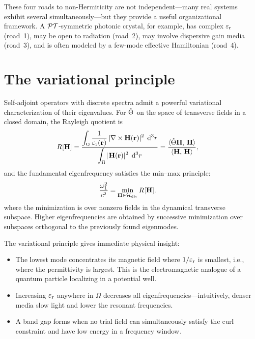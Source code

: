 These four roads to non-Hermiticity are not independent---many real systems
exhibit several simultaneously---but they provide a useful organizational
framework. A $\mathcal{PT}$-symmetric photonic crystal, for example, has
complex $\varepsilon_{\mathrm{r}}$ (road~1), may be open to radiation (road~2), may involve
dispersive gain media (road~3), and is often modeled by a few-mode
effective Hamiltonian (road~4).


\section{The variational principle}
\label{sec:variational}

Self-adjoint operators with discrete spectra admit a powerful variational
characterization of their eigenvalues. For $\hat{\Theta}$ on the space of
transverse fields in a closed domain, the Rayleigh quotient is
\begin{equation}
 R[\mathbf{H}] = \frac{\displaystyle\int_\Omega
 \frac{1}{\varepsilon_{\mathrm{r}}(\mathbf{r})}\,|\nabla\times\mathbf{H}(\mathbf{r})|^2\;\mathop{}\!\mathrm{d}^3 r}
 {\displaystyle\int_\Omega |\mathbf{H}(\mathbf{r})|^2\;\mathop{}\!\mathrm{d}^3 r}
 = \frac{\langle\hat{\Theta}\mathbf{H},\,\mathbf{H}\rangle}{\langle\mathbf{H},\,\mathbf{H}\rangle},
 \label{eq:rayleigh}
\end{equation}
and the fundamental eigenfrequency satisfies the min--max principle:
\begin{equation}
\frac{\omega_1^2}{c^2} = \min_{\mathbf{H} \in \mathcal{H}_{\mathrm{div}}}
R[\mathbf{H}].
 \label{eq:minmax}
\end{equation}
where the minimization is over nonzero fields in the dynamical transverse
subspace. Higher eigenfrequencies are obtained by successive minimization
over subspaces orthogonal to the previously found eigenmodes.

The variational principle gives immediate physical insight:
\begin{itemize}
 \item The lowest mode concentrates its magnetic field where
 $1/\varepsilon_{\mathrm{r}}$ is smallest, i.e., where the permittivity is largest.
 This is the electromagnetic analogue of a quantum particle
 localizing in a potential well.
 \item Increasing $\varepsilon_{\mathrm{r}}$ anywhere in $\Omega$ decreases all
 eigenfrequencies---intuitively, denser media slow light and lower the
 resonant frequencies.
 \item A band gap forms when no trial field can simultaneously satisfy
 the curl constraint and have low energy in a frequency window.
\end{itemize}

